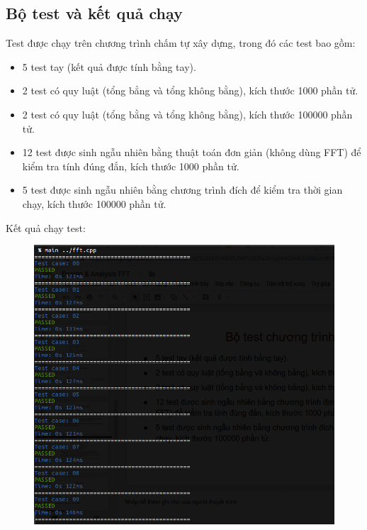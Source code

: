 \documentclass[../report.tex]{subfiles}
\begin{document}
\subsection{Bộ test và kết quả chạy} 
Test được chạy trên chương trình chấm tự xây dựng, trong đó các test 
bao gồm:
\begin{itemize}
    \item 5 test tay (kết quả được tính bằng tay). 
    \item 2 test có quy luật (tổng bẳng và tổng không bằng), 
        kích thước 1000 phần tử. 
    \item 2 test có quy luật (tổng bằng và tổng không bằng), 
        kích thước 100000 phần tử. 
    \item 12 test được sinh ngẫu nhiên bằng thuật toán đơn giản 
        (không dùng FFT) để kiểm tra tính đúng đắn, kích thước 1000 phần tử. 
    \item 5 test được sinh ngẫu nhiên bằng chương trình đích để 
        kiểm tra thời gian chạy, kích thước 100000 phần tử. 
\end{itemize}
Kết quả chạy test: 
\begin{figure}[H]
\centering
\includegraphics[width=\textwidth]{figures/test-a-plus-b-1.png}
\end{figure}
\end{document}
